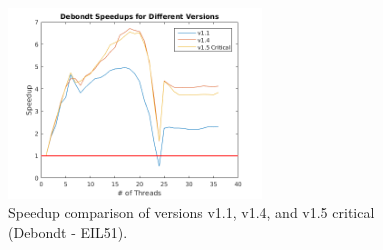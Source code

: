 \documentclass[10pt,letterpaper]{article}
\begin{document}
\begin{figure}
\centering
\includegraphics[width=0.6\textwidth]{../img/debondt_versions.png}
\caption{Speedup comparison of versions v1.1, v1.4, and v1.5 critical (Debondt - EIL51).}
\label{fig:versions}
\end{figure}
\end{document}
